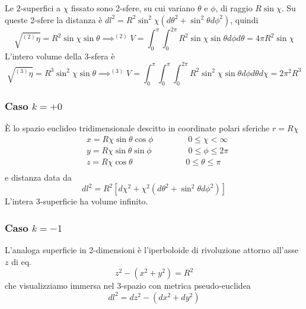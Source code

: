 Le 2-superfici a $\chi$ fissato sono 2-sfere, su cui variano $\theta$ e $\phi$,
di raggio $R \sin \chi$.  Su queste 2-sfere la distanza è $dl^2 = R^2 \sin^2
\chi (d \theta^2+\sin^2 \theta d\phi^2)$, quindi
\begin{equation}
  \sqrt{^{(2)}\eta } = R^2 \sin\chi \sin \theta \implies
  ^{(2)}V= \int_0^{\pi} \int_0^{2 \pi} R^2 \sin\chi \sin \theta d \phi d \theta =
  4\pi R^2 \sin \chi
\end{equation}
L'intero volume della 3-sfera è
\begin{equation}
  \sqrt{^{(3)}\eta } = R^3 \sin^2 \chi \sin \theta \implies
  ^{(3)}V = \int_0^{\pi} \int_0^{\pi} \int_0^{2 \pi}  R^2 \sin^2 \chi \sin \theta d
  \phi d \theta d \chi =  2 \pi^2 R^3
\end{equation}

\subsubsection{Caso $k=+0$}

È lo spazio euclideo tridimensionale descitto in coordinate polari sferiche $r=R
\chi$
\begin{equation}
  \begin{split}
    & x=R \chi \sin \theta \cos \phi~~~~~~~~~~~~~~~~~~~   0 \le \chi < \infty \\
    & y=R \chi \sin \theta \sin \phi~~~~~~~~~~~~~~~~~~~~0\le \phi  \le 2 \pi \\
    & z=R \chi \cos \theta~~~~~~~~~~~~~~~~~~~~~~~~~~~~~0\le \theta \le \pi \\
  \end{split}
\end{equation}
e distanza data da
\begin{equation}
  dl^2 = R^2 \left[ d \chi^2 + \chi^2 \left( d \theta^2+\sin^2 \theta d\phi^2
    \right) \right]
\end{equation}
L'intera 3-superficie ha volume infinito.

\subsubsection{Caso $k=-1$}

L'analoga superficie in 2-dimensioni è l'iperboloide di rivoluzione attorno
all'asse $z$ di eq.
\begin{equation}
  z^2 - (x^2+y^2) = R^2
\end{equation}
che visualizziamo immersa nel 3-spazio con metrica pseudo-euclidea
\begin{equation}
  dl^2 = dz^2-(dx^2+dy^2)
\end{equation}

